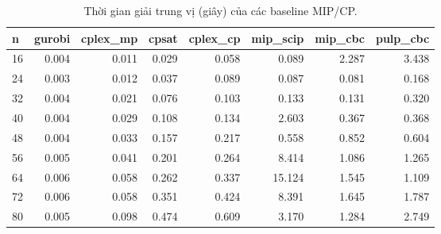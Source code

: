 \begin{table}[t]
\centering
\caption{Thời gian giải trung vị (giây) của các baseline MIP/CP.}
\label{tab:baseline}
\begin{tabular}{lrrrrrrr}
\toprule
n & gurobi & cplex\_mp & cpsat & cplex\_cp & mip\_scip & mip\_cbc & pulp\_cbc \\
\midrule
16 & 0.004 & 0.011 & 0.029 & 0.058 & 0.089 & 2.287 & 3.438 \\
24 & 0.003 & 0.012 & 0.037 & 0.089 & 0.087 & 0.081 & 0.168 \\
32 & 0.004 & 0.021 & 0.076 & 0.103 & 0.133 & 0.131 & 0.320 \\
40 & 0.004 & 0.029 & 0.108 & 0.134 & 2.603 & 0.367 & 0.368 \\
48 & 0.004 & 0.033 & 0.157 & 0.217 & 0.558 & 0.852 & 0.604 \\
56 & 0.005 & 0.041 & 0.201 & 0.264 & 8.414 & 1.086 & 1.265 \\
64 & 0.006 & 0.058 & 0.262 & 0.337 & 15.124 & 1.545 & 1.109 \\
72 & 0.006 & 0.058 & 0.351 & 0.424 & 8.391 & 1.645 & 1.787 \\
80 & 0.005 & 0.098 & 0.474 & 0.609 & 3.170 & 1.284 & 2.749 \\
\bottomrule
\end{tabular}
\end{table}
